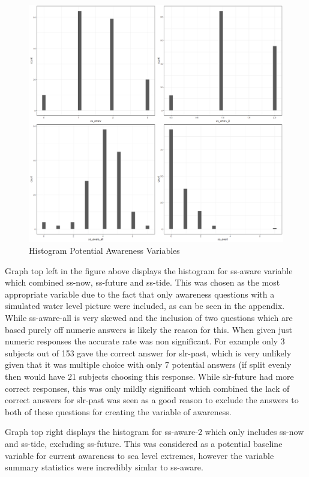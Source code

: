 \begin{figure}[h]
    \centering
    \includegraphics[width=1\textwidth]{fig_results/Awareness.png}
    \caption{Histogram Potential Awareness Variables}
    \label{fig:aware}
\end{figure}

Graph top left in the figure above displays the histogram for ss-aware variable which combined ss-now, ss-future and ss-tide. This was chosen as the most appropriate variable due to the fact that only awareness questions with a simulated water level picture were included, as can be seen in the appendix. While ss-aware-all is very skewed and the inclusion of two questions which are based purely off numeric answers is likely the reason for this. When given just numeric responses the accurate rate was non significant. For example only 3 subjects out of 153 gave the correct answer for slr-past, which is very unlikely given that it was multiple choice with only 7 potential answers (if split evenly then would have 21 subjects choosing this response. While slr-future had more correct responses, this was only mildly significant which combined the lack of correct answers for slr-past was seen as a good reason to exclude the answers to both of these questions for creating the variable of awareness. 

Graph top right displays the histogram for ss-aware-2 which only includes ss-now and ss-tide, excluding ss-future. This was considered as a potential baseline variable for current awareness to sea level extremes, however the variable summary statistics were incredibly simlar to ss-aware.

